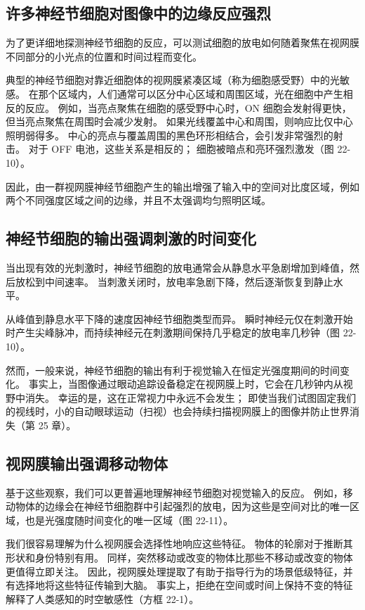 \subsection{许多神经节细胞对图像中的边缘反应强烈}
为了更详细地探测神经节细胞的反应，可以测试细胞的放电如何随着聚焦在视网膜不同部分的小光点的位置和时间过程而变化。

典型的神经节细胞对靠近细胞体的视网膜紧凑区域（称为细胞感受野）中的光敏感。 在那个区域内，人们通常可以区分中心区域和周围区域，光在细胞中产生相反的反应。 例如，当亮点聚焦在细胞的感受野中心时，ON 细胞会发射得更快，但当亮点聚焦在周围时会减少发射。 如果光线覆盖中心和周围，则响应比仅中心照明弱得多。 中心的亮点与覆盖周围的黑色环形相结合，会引发非常强烈的射击。 对于 OFF 电池，这些关系是相反的； 细胞被暗点和亮环强烈激发（图 22-10）。

因此，由一群视网膜神经节细胞产生的输出增强了输入中的空间对比度区域，例如两个不同强度区域之间的边缘，并且不太强调均匀照明区域。

\subsection{神经节细胞的输出强调刺激的时间变化}
当出现有效的光刺激时，神经节细胞的放电通常会从静息水平急剧增加到峰值，然后放松到中间速率。 当刺激关闭时，放电率急剧下降，然后逐渐恢复到静止水平。

从峰值到静息水平下降的速度因神经节细胞类型而异。 瞬时神经元仅在刺激开始时产生尖峰脉冲，而持续神经元在刺激期间保持几乎稳定的放电率几秒钟（图 22-10）。

然而，一般来说，神经节细胞的输出有利于视觉输入在恒定光强度期间的时间变化。 事实上，当图像通过眼动追踪设备稳定在视网膜上时，它会在几秒钟内从视野中消失。 幸运的是，这在正常视力中永远不会发生； 即使当我们试图固定我们的视线时，小的自动眼球运动（扫视）也会持续扫描视网膜上的图像并防止世界消失（第 25 章）。

\subsection{视网膜输出强调移动物体}
基于这些观察，我们可以更普遍地理解神经节细胞对视觉输入的反应。 例如，移动物体的边缘会在神经节细胞群中引起强烈的放电，因为这些是空间对比的唯一区域，也是光强度随时间变化的唯一区域（图 22-11）。

我们很容易理解为什么视网膜会选择性地响应这些特征。 物体的轮廓对于推断其形状和身份特别有用。 同样，突然移动或改变的物体比那些不移动或改变的物体更值得立即关注。 因此，视网膜处理提取了有助于指导行为的场景低级特征，并有选择地将这些特征传输到大脑。 事实上，拒绝在空间或时间上保持不变的特征解释了人类感知的时空敏感性（方框 22-1）。


